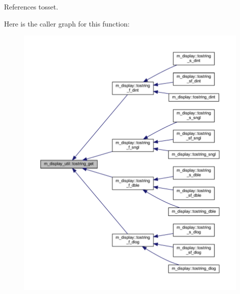References tosset.

Here is the caller graph for this function\+:
\nopagebreak
\begin{figure}[H]
\begin{center}
\leavevmode
\includegraphics[width=350pt]{namespacem__display__util_a8329f722c059861aa54faa8f7668cc41_icgraph}
\end{center}
\end{figure}
\mbox{\label{namespacem__display__util_a7803f63457d826fc3b8fe7ddfa7818ac}} 
